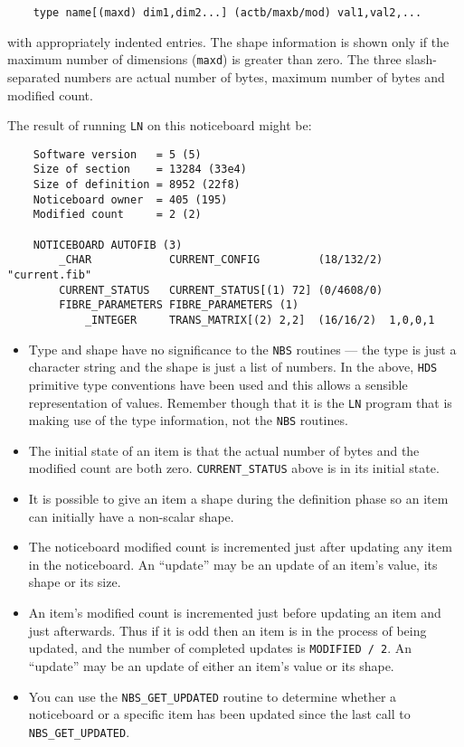\begin {verbatim}
    type name[(maxd) dim1,dim2...] (actb/maxb/mod) val1,val2,...
\end{verbatim}

with appropriately indented entries. The shape information is shown only if
the maximum number of dimensions ({\tt maxd}) is greater than zero. The three
slash-separated numbers are actual number of bytes, maximum number of bytes and
modified count.

The result of running {\tt LN} on this noticeboard might be:

\begin {verbatim}
    Software version   = 5 (5)
    Size of section    = 13284 (33e4)
    Size of definition = 8952 (22f8)
    Noticeboard owner  = 405 (195)
    Modified count     = 2 (2)

    NOTICEBOARD AUTOFIB (3)
        _CHAR            CURRENT_CONFIG         (18/132/2) "current.fib"
        CURRENT_STATUS   CURRENT_STATUS[(1) 72] (0/4608/0)
        FIBRE_PARAMETERS FIBRE_PARAMETERS (1)
            _INTEGER     TRANS_MATRIX[(2) 2,2]  (16/16/2)  1,0,0,1
\end{verbatim}

\begin {itemize}
\item Type and shape have no significance to the {\tt NBS} routines --- the type
is just a character string and the shape is just a list of numbers. In the
above, {\tt HDS} primitive type conventions have been used and this allows a
sensible representation of values. Remember though that it is the {\tt LN}
program that is making use of the type information, not the {\tt NBS} routines.
\item The initial state of an item is that the actual number of bytes and the
modified count are both zero. {\tt CURRENT\_STATUS} above is in its initial
state.
\item It is possible to give an item a shape during the definition phase so an
item can initially have a non-scalar shape.
\item The noticeboard modified count is incremented just after updating any
item in the noticeboard. An ``update'' may be an update of an item's value, its
shape or its size.
\item An item's modified count is incremented just before updating an item
and just afterwards. Thus if it is odd then an item is in the process of
being updated, and the number of completed updates is {\tt MODIFIED~/~2}. An
``update'' may be an update of either an item's value or its shape.
\item You can use the {\tt NBS\_GET\_UPDATED} routine to determine whether
a noticeboard or a specific item has been updated since the last call to {\tt
NBS\_GET\_UPDATED}.
\end {itemize}

